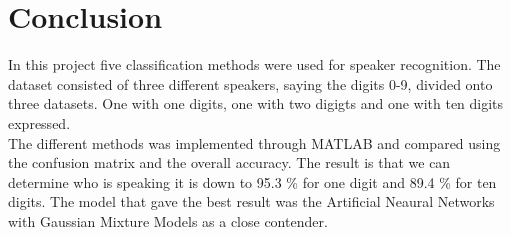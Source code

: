 \section*{Conclusion}
In this project five classification methods were used for speaker recognition.
The dataset consisted of three different speakers, saying the digits 0-9, divided onto three datasets.
One with one digits, one with two digigts and one with ten digits expressed.\\

The different methods was implemented through MATLAB and compared using the confusion matrix and the overall accuracy.
The result is that we can determine who is speaking it is down to 95.3 \% for one digit and 89.4 \% for ten digits.
The model that gave the best result was the Artificial Neaural Networks with Gaussian Mixture Models as a close contender.

  